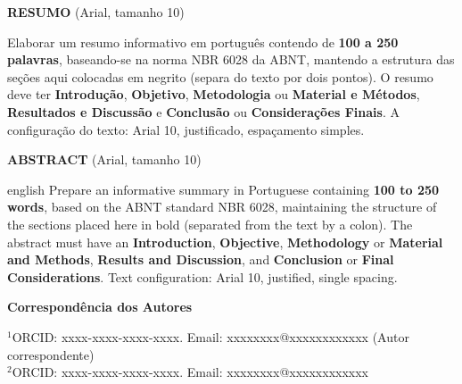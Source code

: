 
\noindent\textcolor{VerdeSomma}{\textbf{RESUMO} \textnormal{(Arial, tamanho 10)}}

{\arialfont\fontsize{10}{10.8}\selectfont
\noindent Elaborar um resumo informativo em português contendo de \textbf{100 a 250 palavras}, baseando-se na norma NBR 6028 da ABNT, mantendo a estrutura das seções aqui colocadas em negrito (separa do texto por dois pontos). O resumo deve ter \textbf{Introdução}, \textbf{Objetivo}, \textbf{Metodologia} ou \textbf{Material e Métodos}, \textbf{Resultados e Discussão} e \textbf{Conclusão} ou \textbf{Considerações Finais}. A configuração do texto: Arial 10, justificado, espaçamento simples.}

\vspace{0.2cm}
\noindent{}

\vspace{0.2cm}
\begin{center}
    \tituloingles
\end{center}
\vspace{0.1cm}

\noindent\textcolor{VerdeSomma}{\textbf{ABSTRACT} \textnormal{(Arial, tamanho 10)}}

\begin{otherlanguage*}{english}
{\arialfont\fontsize{10}{10.8}\selectfont
\noindent Prepare an informative summary in Portuguese containing \textbf{100 to 250 words}, based on the ABNT standard NBR 6028, maintaining the structure of the sections placed here in bold (separated from the text by a colon). The abstract must have an \textbf{Introduction}, \textbf{Objective}, \textbf{Methodology} or \textbf{Material and Methods}, \textbf{Results and Discussion}, and \textbf{Conclusion} or \textbf{Final Considerations}. Text configuration: Arial 10, justified, single spacing.}

\vspace{0.2cm}
\noindent{}
\end{otherlanguage*}

\vspace{0.2cm}
\noindent\textcolor{VerdeEscuroSomma}{\textbf{Correspondência dos Autores}}

\vspace{0.1cm}
{\arialfont\fontsize{9}{11}\selectfont\color{VerdeEscuroSomma}
\noindent $^1$ORCID: xxxx-xxxx-xxxx-xxxx. Email: xxxxxxxx@xxxxxxxxxxxx (Autor correspondente)\\
\noindent $^2$ORCID: xxxx-xxxx-xxxx-xxxx. Email: xxxxxxxx@xxxxxxxxxxxx
}
